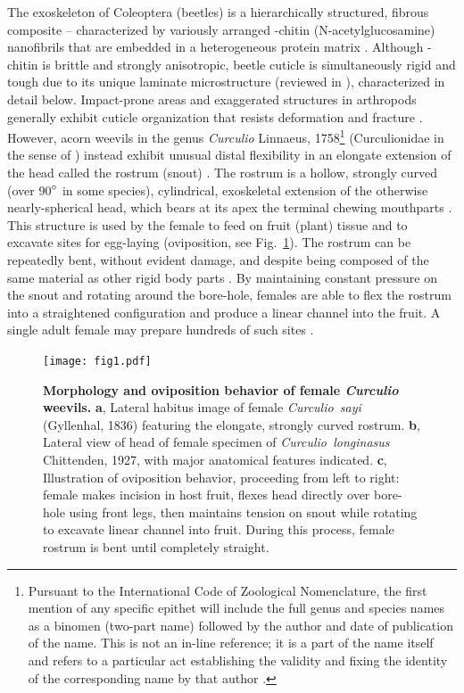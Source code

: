 \documentclass[twocolumn, linenumbers, superscriptaddress, nofootinbib]{revtex4-1}
\begin{document}
	The exoskeleton of Coleoptera (beetles) is a hierarchically structured, fibrous composite -- characterized by variously arranged \textalpha-chitin (N-acetylglucosamine) nanofibrils that are embedded in a heterogeneous protein matrix \cite{Hepburn1973, Jansen2016, Vincent2004}.
	Although \textalpha-chitin is brittle and strongly anisotropic, beetle cuticle is simultaneously rigid and tough due to its unique laminate microstructure (reviewed in \cite{Kamp2010, Kamp2015, Neville1976}), characterized in detail below.
	Impact-prone areas and exaggerated structures in arthropods generally exhibit cuticle organization that resists deformation and fracture \cite{Amini2015, Mccullough2014mech, Mccullough2014struc, Dirks2012, Dirks2013}.
	However, acorn weevils in the genus \textit{Curculio} Linnaeus, 1758\footnote{
		Pursuant to the International Code of Zoological Nomenclature, the first mention of any specific epithet will include the full genus and species names as a binomen (two-part name) followed by the author and date of publication of the name.
		This is not an in-line reference; it is a part of the name itself and refers to a particular act establishing the validity and fixing the identity of the corresponding name by that author \cite{ICZN1999}.}
	(Curculionidae in the sense of \cite{Davis2014}) instead exhibit unusual distal flexibility in an elongate extension of the head called the rostrum (snout) \cite{Toju2005, Jansen2016, Singh2016, Gibson1969}.
	The rostrum is a hollow, strongly curved (over 90$\degree$ in some species), cylindrical, exoskeletal extension of the otherwise nearly-spherical head, which bears at its apex the terminal chewing mouthparts \cite{Morimoto2003, Ting1933, Ting1936, Dennell1942, Gibson1969}.
	This structure is used by the female to feed on fruit (plant) tissue and to excavate sites for egg-laying (oviposition, see Fig.~\ref{fig::curculio}).
	The rostrum can be repeatedly bent, without evident damage, and despite being composed of the same material as other rigid body parts \cite{Jansen2016, Singh2016, Gibson1969, Toju2005}.
	By maintaining constant pressure on the snout and rotating around the bore-hole, females are able to flex the rostrum into a straightened configuration and produce a linear channel into the fruit.
	A single adult female may prepare hundreds of such sites \cite{Toju2005, Moffett1989, AguirreUribe1978}.
	
	\begin{figure}
		\centering
		\texttt{[image: fig1.pdf]}
		\caption{\textbf{Morphology and oviposition behavior of female \textit{Curculio} weevils.} 
			\textbf{a}, Lateral habitus image of female \textit{Curculio~sayi} (Gyllenhal, 1836) featuring the elongate, strongly curved rostrum.
			\textbf{b}, Lateral view of head of female specimen of \textit{Curculio~longinasus} Chittenden, 1927, with major anatomical features indicated.
			\textbf{c}, Illustration of oviposition behavior, proceeding from left to right: female makes incision in host fruit, flexes head directly over bore-hole using front legs, then maintains tension on snout while rotating to excavate linear channel into fruit. During this process, female rostrum is bent until completely straight.
		}
		\label{fig::curculio}
	\end{figure}
	
\end{document}
